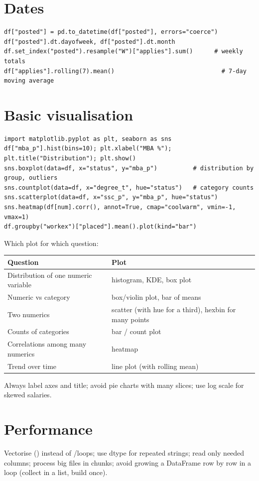 \section{Dates}
\begin{lstlisting}
df["posted"] = pd.to_datetime(df["posted"], errors="coerce")
df["posted"].dt.dayofweek, df["posted"].dt.month
df.set_index("posted").resample("W")["applies"].sum()      # weekly totals
df["applies"].rolling(7).mean()                              # 7-day moving average
\end{lstlisting}

\section{Basic visualisation}
\begin{lstlisting}
import matplotlib.pyplot as plt, seaborn as sns
df["mba_p"].hist(bins=10); plt.xlabel("MBA %"); plt.title("Distribution"); plt.show()
sns.boxplot(data=df, x="status", y="mba_p")          # distribution by group, outliers
sns.countplot(data=df, x="degree_t", hue="status")   # category counts
sns.scatterplot(data=df, x="ssc_p", y="mba_p", hue="status")
sns.heatmap(df[num].corr(), annot=True, cmap="coolwarm", vmin=-1, vmax=1)
df.groupby("workex")["placed"].mean().plot(kind="bar")
\end{lstlisting}
Which plot for which question:
\begin{center}\small
\begin{tabularx}{\linewidth}{l X}
\toprule
Question & Plot\\
\midrule
Distribution of one numeric variable & histogram, KDE, box plot\\
Numeric vs category & box/violin plot, bar of means\\
Two numerics & scatter (with hue for a third), hexbin for many points\\
Counts of categories & bar / count plot\\
Correlations among many numerics & heatmap\\
Trend over time & line plot (with rolling mean)\\
\bottomrule
\end{tabularx}
\end{center}
Always label axes and title; avoid pie charts with many slices; use log scale for skewed salaries.

\section{Performance}
Vectorise () instead of /loops; use  dtype for repeated strings; read only needed columns; process big files in chunks;
avoid growing a DataFrame row by row in a loop (collect in a list, build once).


